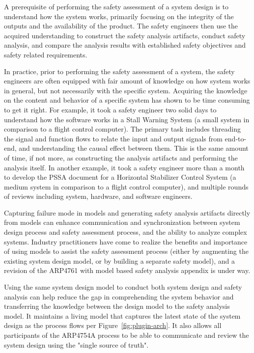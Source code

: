A prerequisite of performing the safety assessment of a system design is to understand how the system works, primarily focusing on the integrity of the outputs and the availability of the product. The safety engineers then use the acquired understanding to construct the safety analysis artifacts, conduct safety analysis, and compare the analysis results with established safety objectives and safety related requirements. 

In practice, prior to performing the safety assessment of a system, the safety engineers are often equipped with fair amount of knowledge on how system works in general, but not necessarily with the specific system. Acquiring the knowledge on the content and behavior of a specific system has shown to be time consuming to get it right. For example, it took a safety engineer two solid days to understand how the software works in a Stall Warning System (a small system in comparison to a flight control computer). The primary task includes threading the signal and function flows to relate the input and output signals from end-to-end, and understanding the causal effect between them. This is the same amount of time, if not more, as constructing the analysis artifacts and performing the analysis itself. In another example, it took a safety engineer more than a month to develop the PSSA document for a Horizontal Stabilizer Control System (a medium system in comparison to a flight control computer), and multiple rounds of reviews including system, hardware, and software engineers.

Capturing failure mode in models and generating safety analysis artifacts directly from models can enhance communication and synchronization between system design process and safety assessment process, and the ability to analyze complex systems. Industry practitioners have come to realize the benefits and importance of
using models to assist the safety assessment process (either by augmenting the existing system design model, or by building a separate safety model), and a revision of the ARP4761 with model based safety analysis appendix is under way.

Using the same system design model to conduct both system design and safety analysis can help reduce the gap in comprehending the system behavior and transferring the knowledge between the design model to the safety analysis model. It maintains a living model that captures the latest state of the system design as the process flows per Figure~\ref{fig:plugin-arch}. It also allows all participants of the ARP4754A process to be able to communicate and review the system design using the "single source of truth". 

